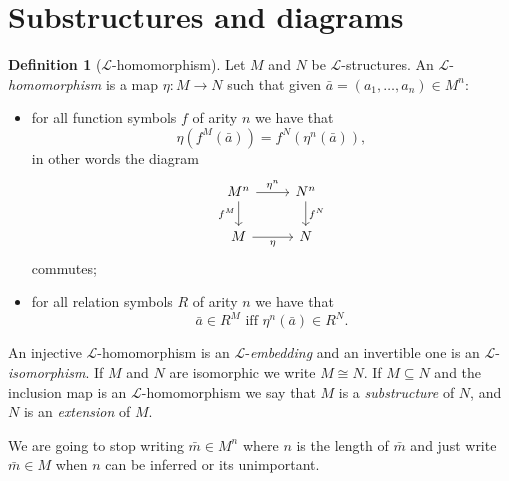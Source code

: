 \documentclass{report}
\theoremstyle{definition}
\theoremstyle{plain}
\theoremstyle{definition}
\newtheorem{defn}[thm]{Definition}
\begin{document}
	\section{Substructures and diagrams}
	\begin{defn}[$\mathcal{L}$-homomorphism]
		Let $M$ and $N$ be $\mathcal{L}$-structures. An $\mathcal{L}$-\emph{homomorphism} is a map $\eta\colon M \to N$ such that given $\bar{a} = (a_1,\ldots,a_n)\in M^n$:
		\begin{itemize}
			\item for all function symbols $f$ of arity $n$ we have that 
			\[
				\eta(f^{M}(\bar{a})) = f^N(\eta^n(\bar{a})),
			\]
			in other words the diagram
			\[\begin{tikzcd}
				{M^n} & {N^n} \\
				M & N
				\arrow["\eta"', from=2-1, to=2-2]
				\arrow["{f^M}"', from=1-1, to=2-1]
				\arrow["{f^N}", from=1-2, to=2-2]
				\arrow["{\eta^n}", from=1-1, to=1-2]
			\end{tikzcd}\]
			commutes;
			\item for all relation symbols $R$ of arity $n$ we have that
			\[
				\bar{a}\in R^M \text{ iff }\eta^n(\bar{a})\in  R^N.
			\]
		\end{itemize}
		An injective $\mathcal{L}$-homomorphism is an $\mathcal{L}$-\emph{embedding} and an invertible one is an $\mathcal{L}$-\emph{isomorphism}. If $M$ and $N$ are isomorphic we write $M \cong N$. If $M\subseteq N$ and the inclusion map is an $\mathcal{L}$-homomorphism we say that $M$ is a \emph{substructure} of $N$, and $N$ is an \emph{extension} of $M$.
	\end{defn}
	We are going to stop writing $\bar{m}\in M^n$ where $n$ is the length of $\bar{m}$ and just write $\bar{m}\in M$ when $n$ can be inferred or its unimportant.
\end{document}
